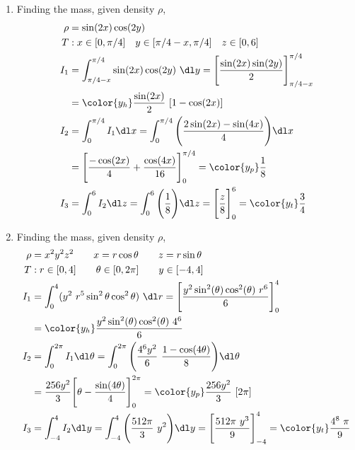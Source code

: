 \begin{enumerate}
    \item Finding the mass, given density $ \rho $,
          \begin{align}
              \rho & = \sin(2x)\cos(2y)                                      \\
              T    & : x \in [0, \pi/4] \quad y \in [\pi/4 - x, \pi/4]
              \quad z \in [0, 6]                                             \\
              I_1  & = \int_{\pi/4 - x}^{\pi/4} \sin(2x) \cos(2y)\ \dl y
              = \Bigg[ \frac{\sin(2x)\sin(2y)}{2} \Bigg]_{\pi/4 - x}^{\pi/4} \\
                   & = {\color{y_h} \frac{\sin(2x)}{2}\ [1 - \cos(2x)]}      \\
              I_2  & = \int_{0}^{\pi/4}I_1 \dl x = \int_{0}^{\pi/4}
              \Bigg( \frac{2\sin(2x) - \sin(4x)}{4} \Bigg) \dl x             \\
                   & = \Bigg[ \frac{-\cos(2x)}{4} + \frac{\cos(4x)}{16}
                  \Bigg]_{0}^{\pi/4}
              = {\color{y_p} \frac{1}{8} }                                   \\
              I_3  & = \int_{0}^{6} I_2 \dl z = \int_{0}^{6}
              \Bigg( \frac{1}{8} \Bigg) \dl z
              = \Bigg[ \frac{z}{8} \Bigg]_0^6
              = {\color{y_t} \frac{3}{4}}
          \end{align}

    \item Finding the mass, given density $ \rho $,
          \begin{align}
              \rho & = x^2y^2z^2 \qquad x = r\cos \theta \qquad z = r\sin \theta     \\
              T    & : r \in [0, 4] \qquad \theta \in [0, 2\pi]
              \qquad y \in [-4, 4]                                                   \\
              I_1  & = \int_{0}^{4} (y^2\ r^5 \sin^2 \theta \cos^2 \theta)
              \ \dl r
              = \Bigg[ \frac{y^2 \sin^2 (\theta) \cos^2 (\theta)\ r^6}{6}
              \Bigg]_{0}^{4}                                                         \\
                   & = {\color{y_h} \frac{y^2 \sin^2(\theta)\cos^2(\theta)\ 4^6}{6}} \\
              I_2  & = \int_{0}^{2\pi}I_1 \dl \theta = \int_{0}^{2\pi}
              \Bigg( \frac{4^6y^2}{6}\ \frac{1 - \cos(4\theta)}{8} \Bigg) \dl \theta \\
                   & = \frac{256y^2}{3}\Bigg[ \theta - \frac{\sin(4\theta)}{4}
                  \Bigg]_{0}^{2\pi}
              = {\color{y_p} \frac{256y^2}{3}\ [2\pi] }                              \\
              I_3  & = \int_{-4}^{4} I_2 \dl y = \int_{-4}^{4}
              \Bigg( \frac{512\pi}{3}\ y^2 \Bigg) \dl y
              = \Bigg[ \frac{512\pi\ y^3}{9} \Bigg]_{-4}^{4}
              = {\color{y_t} \frac{4^8\ \pi}{9}}
          \end{align}


\end{enumerate}

